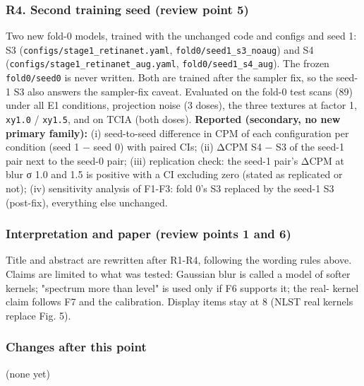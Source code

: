 \subsubsection*{R4. Second training seed (review point 5)}
Two new fold-0 models, trained with the unchanged code and configs and seed 1: S3 (\texttt{configs/stage1\_retinanet.yaml}, \texttt{fold0/seed1\_s3\_noaug}) and S4 (\texttt{configs/stage1\_retinanet\_aug.yaml}, \texttt{fold0/seed1\_s4\_aug}). The frozen \texttt{fold0/seed0} is never written. Both are trained after the sampler fix, so the seed-1 S3 also answers the sampler-fix caveat. Evaluated on the fold-0 test scans (89) under all E1 conditions, projection noise (3 doses), the three textures at factor 1, \texttt{xy1.0} / \texttt{xy1.5}, and on TCIA (both doses). \textbf{Reported (secondary, no new primary family):} (i) seed-to-seed difference in CPM of each configuration per condition (seed 1 − seed 0) with paired CIs; (ii) ΔCPM S4 − S3 of the seed-1 pair next to the seed-0 pair; (iii) replication check: the seed-1 pair's ΔCPM at blur σ 1.0 and 1.5 is positive with a CI excluding zero (stated as replicated or not); (iv) sensitivity analysis of F1-F3: fold 0's S3 replaced by the seed-1 S3 (post-fix), everything else unchanged.

\subsubsection*{Interpretation and paper (review points 1 and 6)}
Title and abstract are rewritten after R1-R4, following the wording rules above. Claims are limited to what was tested: Gaussian blur is called a model of softer kernels; "spectrum more than level" is used only if F6 supports it; the real- kernel claim follows F7 and the calibration. Display items stay at 8 (NLST real kernels replace Fig. 5).

\subsubsection*{Changes after this point}
(none yet)

